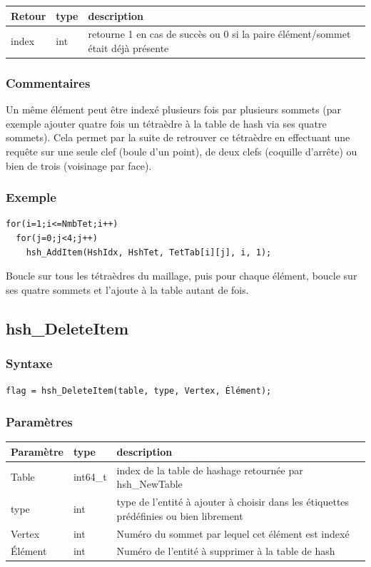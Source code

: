 \documentclass[a4paper,12pt]{article}
\begin{document}
\medskip

\begin{tabular}{|m{3cm}|m{2cm}|m{8.5cm}|}
\hline
Retour     & type   & description \\
\hline
index      & int    & retourne 1 en cas de succès ou 0 si la paire élément/sommet était déjà présente \\
\hline
\end{tabular}

\subsubsection*{Commentaires}
Un même élément peut être indexé plusieurs fois par plusieurs sommets (par exemple ajouter quatre fois un tétraèdre à la table de hash via ses quatre sommets).
Cela permet par la suite de retrouver ce tétraèdre en effectuant une requête sur une seule clef (boule d'un point), de deux clefs (coquille d'arrête) ou bien de trois (voisinage par face).

\subsubsection*{Exemple}

\begin{tt}
\begin{verbatim}
for(i=1;i<=NmbTet;i++)
  for(j=0;j<4;j++)
    hsh_AddItem(HshIdx, HshTet, TetTab[i][j], i, 1);
\end{verbatim}
\end{tt}
\normalfont

Boucle sur tous les tétraèdres du maillage, puis pour chaque élément, boucle sur ses quatre sommets et l'ajoute à la table autant de fois.


\subsection{hsh\_DeleteItem}

\subsubsection*{Syntaxe}
{\tt flag = hsh\_DeleteItem(table, type, Vertex, Élément);}

\subsubsection*{Paramètres}
\begin{tabular}{|m{3cm}|m{2cm}|m{8.5cm}|}
\hline
Paramètre  & type     & description \\
\hline
Table      & int64\_t  & index de la table de hashage retournée par hsh\_NewTable \\
\hline
type       & int      & type de l'entité à ajouter à choisir dans les étiquettes prédéfinies ou bien librement \\
\hline
Vertex     & int      & Numéro du sommet par lequel cet élément est indexé \\
\hline
Élément    & int      & Numéro de l'entité à supprimer à la table de hash \\
\hline
\end{tabular}
\end{document}
